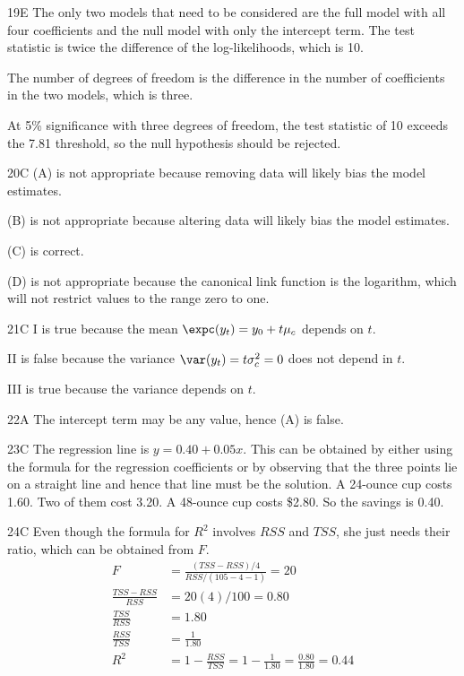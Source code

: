 \begin{solution}{19}{E}
The only two models that need to be considered are the full model with all four coefficients and the null model with only the intercept term. The test statistic is twice the difference of the log-likelihoods, which is 10.

The number of degrees of freedom is the difference in the number of coefficients in the two models, which is three.

At 5\% significance with three degrees of freedom, the test statistic of 10 exceeds the 7.81 threshold, so the null hypothesis should be rejected.
\end{solution}

\begin{solution}{20}{C}
(A) is not appropriate because removing data will likely bias the model estimates.

(B) is not appropriate because altering data will likely bias the model estimates.

(C) is correct.

(D) is not appropriate because the canonical link function is the logarithm, which will not restrict values to the range zero to one.
\end{solution}

\begin{solution}{21}{C}
I is true because the mean $\expc(y_t) = y_0 + t\mu_c$ depends on $t$.

II is false because the variance $\var(y_t) = t\sigma_c^2 = 0$ does not depend in $t$.

III is true because the variance depends on $t$.
\end{solution}

\begin{solution}{22}{A}
The intercept term may be any value, hence (A) is false.
\end{solution}

\begin{solution}{23}{C}
The regression line is $y = 0.40 + 0.05 x$. This can be obtained by either using the formula for the regression coefficients or by observing that the three points lie on a straight line and hence that line must be the solution. A 24-ounce cup costs 1.60. Two of them cost 3.20. A 48-ounce cup costs \$2.80. So the savings is 0.40.
\end{solution}

\begin{solution}{24}{C}
Even though the formula for $R^2$ involves $RSS$ and $TSS$, she just needs their ratio, which can be obtained from $F$.
\begin{align*}
F &= \frac{(TSS - RSS)/4}{RSS/(105-4-1)} = 20 \\
\frac{TSS - RSS}{RSS} &= 20(4)/100 = 0.80 \\
\frac{TSS}{RSS} &= 1.80 \\
\frac{RSS}{TSS} &= \frac{1}{1.80} \\
R^2 &= 1 - \frac{RSS}{TSS} = 1 - \frac{1}{1.80} = \frac{0.80}{1.80} = 0.44
\end{align*}
\end{solution}

